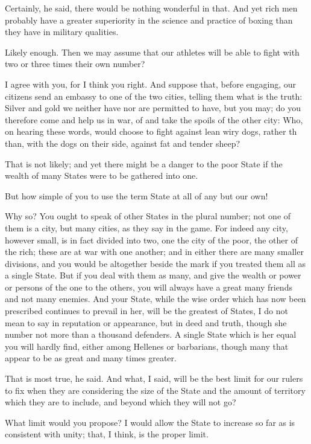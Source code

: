 Certainly, he said, there would be nothing wonderful in that.
And yet rich men probably have a greater superiority in the science and practice of boxing than they have in military qualities.

Likely enough.
Then we may assume that our athletes will be able to fight with two or three times their own number?

I agree with you, for I think you right.
And suppose that, before engaging, our citizens send an embassy to one of the two cities, telling them what is the truth: Silver and gold we neither have nor are permitted to have, but you may; do you therefore come and help us in war, of and take the spoils of the other city: Who, on hearing these words, would choose to fight against lean wiry dogs, rather th than, with the dogs on their side, against fat and tender sheep?

That is not likely; and yet there might be a danger to the poor State if the wealth of many States were to be gathered into one.

But how simple of you to use the term State at all of any but our own!

Why so?
You ought to speak of other States in the plural number; not one of them is a city, but many cities, as they say in the game. For indeed any city, however small, is in fact divided into two, one the city of the poor, the other of the rich; these are at war with one another; and in either there are many smaller divisions, and you would be altogether beside the mark if you treated them all as a single State. But if you deal with them as many, and give the wealth or power or persons of the one to the others, you will always have a great many friends and not many enemies. And your State, while the wise order which has now been prescribed continues to prevail in her, will be the greatest of States, I do not mean to say in reputation or appearance, but in deed and truth, though she number not more than a thousand defenders. A single State which is her equal you will hardly find, either among Hellenes or barbarians, though many that appear to be as great and many times greater.

That is most true, he said.
And what, I said, will be the best limit for our rulers to fix when they are considering the size of the State and the amount of territory which they are to include, and beyond which they will not go?

What limit would you propose?
I would allow the State to increase so far as is consistent with unity; that, I think, is the proper limit.

